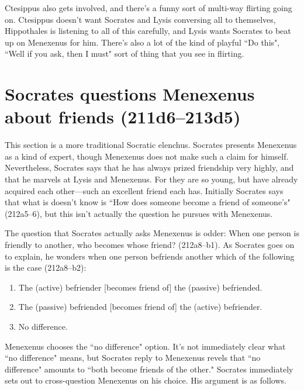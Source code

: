 \documentclass[11pt]{article}
\begin{document}
Ctesippus also gets involved, and there's a funny sort of multi-way flirting
going on.  Ctesippus doesn't want Socrates and Lysis conversing all to
themselves, Hippothales is listening to all of this carefully, and Lysis wants
Socrates to beat up on Menexenus for him.  There's also a lot of the kind of
playful ``Do this", ``Well if you ask, then I must" sort of thing that you see
in flirting.


\section{Socrates questions Menexenus about friends (211d6--213d5)}

This section is a more traditional Socratic elenchus.  Socrates presents
Menexenus as a kind of expert, though Menexenus does not make such a claim for
himself.  Nevertheless, Socrates says that he has always prized friendship very
highly, and that he marvels at Lysis and Menexenus. For they are so young, but
have already acquired each other---such an excellent friend each has.
Initially Socrates says that what is doesn't know is ``How does someone become
a friend of someone's" (212a5--6), but this isn't actually the question he
pursues with Menexenus.

The question that Socrates actually asks Menexenus is odder: When one person is
friendly to another, who becomes whose friend? (212a8--b1).  As Socrates goes
on to explain, he wonders when one person befriends another which of the
following is the case (212a8--b2):

\begin{enumerate}

    \item The (active) befriender [becomes friend of] the (passive) befriended.

    \item The (passive) befriended [becomes friend of] the (active) befriender.

    \item No difference.

\end{enumerate}

Menexenus chooses the ``no difference" option.  It's not immediately clear what
``no difference" means, but Socrates reply to Menexenus revels that ``no
difference" amounts to ``both become friends of the other."  Socrates
immediately sets out to cross-question Menexenus on his choice.  His argument
is as follows.
\end{document}
